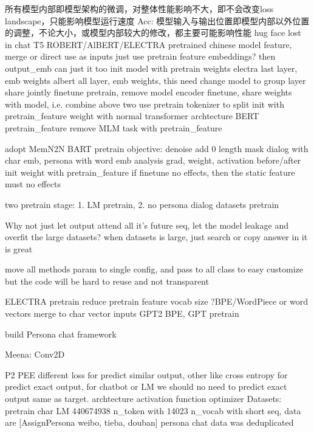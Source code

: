 \documentclass[letterpaper]{article} %
\begin{document}
\begin{CJK*}{UTF8}{gbsn}
      所有模型内部即模型架构的微调，对整体性能影响不大，即不会改变loss landscape，只能影响模型运行速度
  Acc:
      模型输入与输出位置即模型内部以外位置的调整，不论大小，或模型内部较大的修改，都主要可能影响性能
      hug face
      lost in chat
      T5
      ROBERT/AlBERT/ELECTRA pretrained chinese model feature, merge or direct use as inputs
      just use pretrain feature embeddings? then output_emb can just it too
      init model with pretrain weights
        electra last layer, emb weights
        albert all layer, emb weights, this need change model to group layer share
      jointly finetune pretrain, remove model encoder
      finetune, share weights with model, i.e. combine above two
      use pretrain tokenizer to split
      init with pretrain_feature weight with normal transformer archtecture
      BERT pretrain_feature
      remove MLM task with pretrain_feature

      adopt MemN2N 
      BART pretrain objective: denoise add 0 length mask
      dialog with char emb, persona with word emb
      analysis grad, weight, activation before/after init weight with pretrain_feature 
        if finetune no effects, then the static feature must no effects

      two pretrain stage: 1. LM pretrain, 2. no persona dialog datasets pretrain

      Why not just let output attend all it's future seq, 
        let the model leakage and overfit the large datasets?
        when datasets is large, just search or copy answer in it is great

      move all methods param to single config, and pass to all class to easy customize
        but the code will be hard to reuse and not transparent

      ELECTRA pretrain
      reduce pretrain feature vocab size
      ?BPE/WordPiece or word vectors merge to char vector inputs
      GPT2 BPE, GPT pretrain

      build Persona chat framework

      Meena: Conv2D

      P2
      PEE
      different loss for predict similar output, 
        other like cross entropy for predict exact output,
        for chatbot or LM we should no need to predict exact output same as target. 
      archtecture
      activation function
      optimizer
  Datasets:
      pretrain char LM 440674938 n_token with 14023 n_vocab with short seq, data are [AssignPersona weibo, tieba, douban]
      persona chat data was deduplicated 


\end{CJK*}
\end{document}
